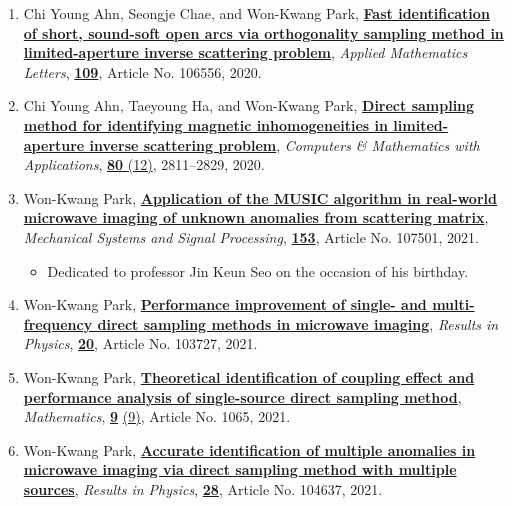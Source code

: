 \documentclass[10pt,A4]{article}
\begin{document}
\begin{enumerate}
\item\label{A-AML2020} Chi Young Ahn, Seongje Chae, and Won-Kwang Park, \href{https://doi.org/10.1016/j.aml.2020.106556}{\textbf{Fast identification of short, sound-soft open arcs via orthogonality sampling method in limited-aperture inverse scattering problem}}, \textit{Applied Mathematics Letters}, \href{https://www.sciencedirect.com/science/journal/08939659/109/supp/C}{\textbf{109}}, Article No. 106556, 2020.
\item\label{A-CAMWA2020} Chi Young Ahn, Taeyoung Ha, and Won-Kwang Park, \href{https://doi.org/10.1016/j.camwa.2020.10.009}{\textbf{Direct sampling method for identifying magnetic inhomogeneities in limited-aperture inverse scattering problem}}, \textit{Computers \& Mathematics with Applications}, \href{https://www.sciencedirect.com/journal/computers-and-mathematics-with-applications/vol/80/issue/12}{\textbf{80} (12)}, 2811--2829, 2020.
\item\label{A-MSSP2021} Won-Kwang Park, \href{https://doi.org/10.1016/j.ymssp.2020.107501}{\textbf{Application of the MUSIC algorithm in real-world microwave imaging of unknown anomalies from scattering matrix}}, \textit{Mechanical Systems and Signal Processing}, \href{https://www.sciencedirect.com/journal/mechanical-systems-and-signal-processing/vol/153/suppl/C}{\textbf{153}}, Article No. 107501, 2021.
    \begin{itemize}
      \item Dedicated to professor Jin Keun Seo on the occasion of his  birthday.
    \end{itemize}
\item\label{A-RINP2021A} Won-Kwang Park, \href{https://doi.org/10.1016/j.rinp.2020.103727}{\textbf{Performance improvement of single- and multi-frequency direct sampling methods in microwave imaging}}, \textit{Results in Physics}, \href{https://www.sciencedirect.com/journal/results-in-physics/vol/20/suppl/C}{\textbf{20}}, Article No. 103727, 2021.
\item\label{A-MATH2021A} Won-Kwang Park, \href{https://doi.org/10.3390/math9091065}{\textbf{Theoretical identification of coupling effect and performance analysis of single-source direct sampling method}}, \textit{Mathematics}, \href{https://www.mdpi.com/2227-7390/9}{\textbf{9}} \href{https://www.mdpi.com/2227-7390/9/9}{(9)}, Article No. 1065, 2021.
\item\label{A-RINP2021B} Won-Kwang Park, \href{https://doi.org/10.1016/j.rinp.2021.104637}{\textbf{Accurate identification of multiple anomalies in microwave imaging via direct sampling method with multiple sources}}, \textit{Results in Physics}, \href{https://www.sciencedirect.com/journal/results-in-physics/vol/28/suppl/C}{\textbf{28}}, Article No. 104637, 2021.

\end{enumerate}
\end{document}
